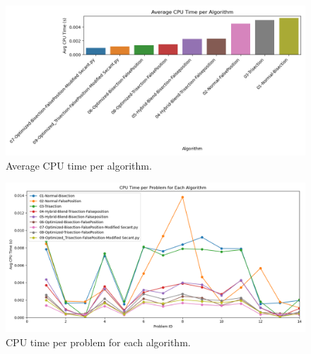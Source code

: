 \documentclass[amsmath, amssymb, aps]{revtex4-2}
\begin{document}
\begin{figure}[H]
    \centering
    \includegraphics[width=0.8\linewidth]{avg_cpu_time_per_algorithm.png}
    \caption{Average CPU time per algorithm.}
    \label{fig:avg_cpu_time}
\end{figure}

\begin{figure}[H]
    \centering
    \includegraphics[width=0.8\linewidth]{cpu_time_lineplot_per_problem.png}
    \caption{CPU time per problem for each algorithm.}
    \label{fig:cpu_time_per_problem}
\end{figure}
\end{document}

